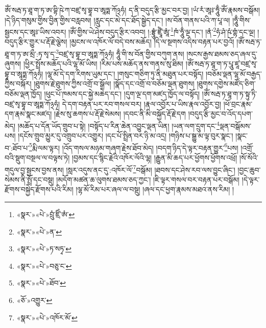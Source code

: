ཨོཾ་སརྦ་ཏ་ཐཱ་ག་ཏ་ཨ་བྷི་ཥེ་ཀ་བཛྲ་སྭ་བྷཱ་བ་ཨཱཏྨ་ཀོ྅ཧཾ། ད་ནི་བདུད་རྩི་མྱང་བར་བྱ། །ཡཾ་རཾ་ཨཱཿ་ཧཱུྃ་ཨོཾ་རྣམས་བསྒོམ། །དེ་ཉིད་གསུམ་གྱིས་བྱིན་གྱིས་བརླབས། །རླུང་དང་མེ་དང་ཐོད་སྒྱེད་དང་། །ས་བོན་གནས་པའི་ཀ་པཱ་ལ། །ཧཱུྃ་གིས་སྦྱངས་དང་ཨཱཿ་ཡིས་འབར། །ཨོཾ་གྱིས་ཡེ་ཤེས་བདུད་རྩིར་འབབ། །:བྷྲཱུཾ་ཛྲཱྀཾ་ཨཱཾ་\footnote{«སྣར་»«པེ་»བྲུཾ་ཛྲིཾ་ཨཾ་}ཁཾ་ཧཱུྃ་ལྔ་དང་། །ནཾ་\footnote{«སྣར་»«པེ་»ན་}ཧཾ་ཤཾ་ཥཾ་གྷཾ་དང་ལྔ། །བདུད་རྩིར་གྱུར་པ་རྡོ་རྗེ་ལྕེས། །མྱངས་ལ་འཁོར་ལོ་བདེ་བས་མཆོད། །དེ་ལ་སྔགས་འདིས་བརྟན་པར་བྱའོ། །ཨོཾ་སརྦ་ཏ་ཐཱ་ག་ཏ་ཨ་མྲྀ་:ཏ་སྭ་ད་\footnote{«སྣར་»«པེ་»ཏ་སཏྭ་}བཛྲ་སྭ་བྷཱ་བ་ཨཱཏྨ་ཀོ྅ཧཾ། ཧཱུྃ་གི་ས་བོན་གྱིས་བཀུག་ནས། །སངས་རྒྱས་ཐམས་ཅད་ཞལ་དུ་ཞུགས། །ཕྱིར་སྤྲོས་མཆོད་པའི་ལྷ་མོ་ཡིས། །རིམ་པས་མཆོད་ནས་གནས་སུ་ཐིམ། །ཨོཾ་སརྦ་ཏ་ཐཱ་ག་ཏ་པཱུ་ཛཱ་བཛྲ་སྭ་བྷཱ་བ་ཨཱཏྨ་ཀོ྅ཧཾ། །ལྷ་མོ་དེ་དག་རིགས་ཡུམ་དང་། །གསུང་གཅིག་ཏུ་ནི་མཐུན་པར་བསྟོད། །བཅོམ་ལྡན་ལྷ་མོ་བརྒྱད་ཀྱིས་བསྐོར། །ཐུགས་རྗེ་ཐུགས་ཀྱིས་འགྲོ་བ་སྒྲོལ། །སྣོད་དང་འགྲོ་བ་བཅོམ་ལྡན་ཐུགས། །ཐུགས་དགྱེས་མཛོད་ཅིག་བཅོམ་ལྡན་ཁྱོད། །ཕུང་པོ་ཁམས་དང་སྐྱེ་མཆེད་དང་། །དུག་ལྔ་དག་མཛད་ཁྱོད་ལ་བསྟོད། །ཨོཾ་སརྦ་ཏ་ཐཱ་ག་ཏ་སྟུ་ཏི་བཛྲ་སྭ་བྷཱ་བ་ཨཱཏྨ་ཀོ྅ཧཾ། དེ་དག་བརྟན་པར་རབ་གསལ་བར། །རྣལ་འབྱོར་པ་ཡིས་རྣལ་འབྱོར་བྱ། །ཕོ་བྲང་རྣམ་དག་རྣམ་སྣང་མཛད། །རྗེས་སུ་ཆགས་པ་རྡོ་རྗེ་སེམས། །དབང་ནི་མི་བསྐྱོད་རྡོ་རྗེ་དག །བདུད་རྩི་མྱང་བ་འོད་དཔག་མེད། །མཆོད་པ་དོན་ཡོད་གྲུབ་པ་སྟེ། །བསྟོད་པ་རིན་ཆེན་འབྱུང་ལྡན་ཡིན། །ཡན་ལག་དྲུག་དང་\footnote{«སྣར་»«པེ་»བཅུ་ང་}ལྡན་བསྒོམས་པས། །དངོས་གྲུབ་མྱུར་དུ་འགྲུབ་པར་འགྱུར། །དང་པོ་སྤྲིན་བར་ཉི་མ་འདྲ། །གཉིས་པ་སྒྱུ་མ་ལྟ་བུར་སྣང་། །སྣང་བ་:ཐོབ་པ་\footnote{«སྣར་»«པེ་»ཐོབ་}རྨི་ལམ་ལྟར། །འོད་གསལ་མཉམ་གཞག་རྗེས་ཐོབ་མེད། །བདག་ཉིད་དེ་ལྟར་བརྟན་གྱུར་\footnote{«ཅོ་»འགྱུར་}པས། །འགྲོ་བའི་སྡུག་བསྔལ་ལ་བལྟས་ཏེ། །བྱམས་དང་སྙིང་རྗེའི་འཁོར་ལོའི་ལྷ། །རྒྱུན་མི་ཆད་པར་ཕྱོགས་ཕྱོགས་འཕྲོ། །སོ་སོའི་གདུལ་བྱ་སྦྱངས་བྱས་ནས། །སླར་འདུས་ནང་དུ་:འཁོར་ལོ་\footnote{«སྣར་»«པེ་»འཁོར་མོ་}བསྒོམ། །ཐབས་དང་ཤེས་རབ་ལས་བྱུང་ཞིང་། །བྱང་ཆུབ་སེམས་ནི་སྤྲོ་དང་བསྡུ། །མདོག་མཚན་ཆ་ལུགས་ཐམས་ཅད་ཀྱང་། །ཇི་ལྟར་གསལ་བར་བརྟན་པར་བསྒོམ། །དེ་ལྟར་རྫོགས་བསྐྱེད་རྫོགས་པའི་རིམ། །ལྷ་མོ་རིམ་པར་ཞལ་ལ་བསྡུ། །ཞལ་དང་ཕྱག་རྣམས་མཐའ་ནས་རིམ། །
